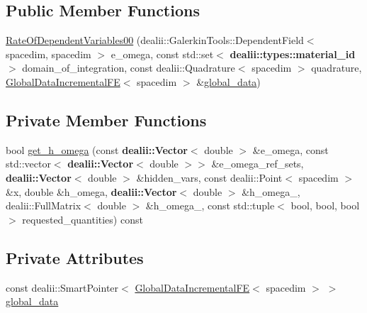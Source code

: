 \subsection*{Public Member Functions}
\begin{DoxyCompactItemize}
\item 
\hyperlink{classincremental_f_e_1_1_rate_of_dependent_variables00_3_01spacedim_00_01spacedim_01_4_a7df6b16916dc6786f60cbecac2cfc4dc}{Rate\+Of\+Dependent\+Variables00} (dealii\+::\+Galerkin\+Tools\+::\+Dependent\+Field$<$ spacedim, spacedim $>$ e\+\_\+omega, const std\+::set$<$ {\bf dealii\+::types\+::material\+\_\+id} $>$ domain\+\_\+of\+\_\+integration, const dealii\+::\+Quadrature$<$ spacedim $>$ quadrature, \hyperlink{classincremental_f_e_1_1_global_data_incremental_f_e}{Global\+Data\+Incremental\+FE}$<$ spacedim $>$ \&\hyperlink{classincremental_f_e_1_1_rate_of_dependent_variables00_3_01spacedim_00_01spacedim_01_4_af139a3e4d382d268ec402515a6d98b85}{global\+\_\+data})
\end{DoxyCompactItemize}
\subsection*{Private Member Functions}
\begin{DoxyCompactItemize}
\item 
bool \hyperlink{classincremental_f_e_1_1_rate_of_dependent_variables00_3_01spacedim_00_01spacedim_01_4_aa9c8e4709b286f4e2abface7ad20795f}{get\+\_\+h\+\_\+omega} (const {\bf dealii\+::\+Vector}$<$ double $>$ \&e\+\_\+omega, const std\+::vector$<$ {\bf dealii\+::\+Vector}$<$ double $>$$>$ \&e\+\_\+omega\+\_\+ref\+\_\+sets, {\bf dealii\+::\+Vector}$<$ double $>$ \&hidden\+\_\+vars, const dealii\+::\+Point$<$ spacedim $>$ \&x, double \&h\+\_\+omega, {\bf dealii\+::\+Vector}$<$ double $>$ \&h\+\_\+omega\+\_, dealii\+::\+Full\+Matrix$<$ double $>$ \&h\+\_\+omega\+\_, const std\+::tuple$<$ bool, bool, bool $>$ requested\+\_\+quantities) const 
\end{DoxyCompactItemize}
\subsection*{Private Attributes}
\begin{DoxyCompactItemize}
\item 
const dealii\+::\+Smart\+Pointer$<$ \hyperlink{classincremental_f_e_1_1_global_data_incremental_f_e}{Global\+Data\+Incremental\+FE}$<$ spacedim $>$ $>$ \hyperlink{classincremental_f_e_1_1_rate_of_dependent_variables00_3_01spacedim_00_01spacedim_01_4_af139a3e4d382d268ec402515a6d98b85}{global\+\_\+data}
\end{DoxyCompactItemize}



